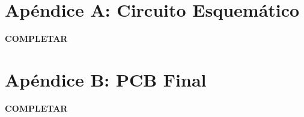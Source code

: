 \appendix
\appendixpage
\addappheadtotoc

\section*{Apéndice A: Circuito Esquemático}
\label{appendix:circuito_esquematico}

\textbf{{\color{red} COMPLETAR}}

\section*{Apéndice B: PCB Final}
\label{appendix:PCB}

\textbf{{\color{red} COMPLETAR}}